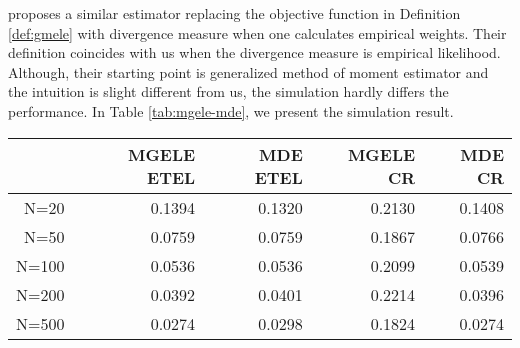 \citet{newey2004higher} proposes a similar estimator replacing the
objective function in Definition \ref{def:gmele} with divergence
measure when one calculates empirical weights. Their definition coincides
with us when the divergence measure is empirical likelihood. Although,
their starting point is generalized method of moment estimator and
the intuition is slight different from us, the simulation hardly differs
the performance. In Table \ref{tab:mgele-mde}, we present the simulation
result. 
\begin{table}
\centering
\begin{tabular}{rrrrr}
  \hline
 & MGELE ETEL & MDE ETEL & MGELE CR & MDE CR \\ 
  \hline
N=20 & 0.1394 & 0.1320 & 0.2130 & 0.1408 \\
   N=50 & 0.0759 & 0.0759 & 0.1867 & 0.0766 \\
   N=100 & 0.0536 & 0.0536 & 0.2099 & 0.0539 \\
   N=200 & 0.0392 & 0.0401 & 0.2214 & 0.0396 \\
   N=500 & 0.0274 & 0.0298 & 0.1824 & 0.0274 \\
    \hline
\end{tabular}
\end{table}



